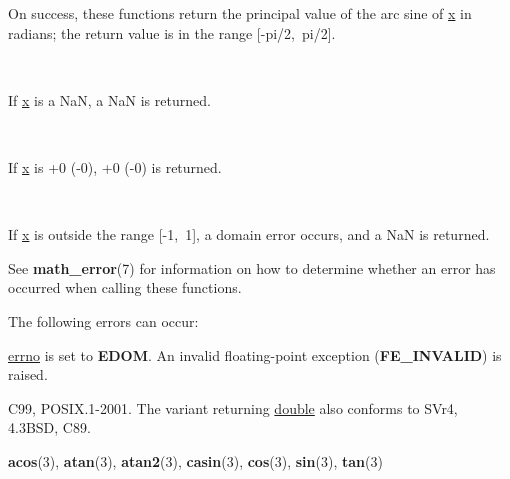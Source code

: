 \documentclass[]{article}
\let\realtextbf=\textbf
\renewcommand{\textbf}[1]{\textcolor{boldcolor}{\realtextbf{#1}}}
\renewcommand{\emph}[1]{\underline{#1}}
\begin{document}

On success, these functions return the principal value of the arc sine
of \emph{x} in radians; the return value is in the range
{[}-pi/2,~pi/2{]}.

~

If \emph{x} is a NaN, a NaN is returned.

~

If \emph{x} is +0 (-0), +0 (-0) is returned.

~

If \emph{x} is outside the range {[}-1,~1{]}, a domain error occurs, and
a NaN is returned.


See \textbf{math\_error}(7) for information on how to determine whether
an error has occurred when calling these functions.

The following errors can occur:

\begin{description}
\itemsep1pt\parskip0pt
\item[Domain error: \emph{x} is outside the range {[}-1,~1{]}]
\emph{errno} is set to \textbf{EDOM}. An invalid floating-point
exception (\textbf{FE\_INVALID}) is raised.
\end{description}


C99, POSIX.1-2001. The variant returning \emph{double} also conforms to
SVr4, 4.3BSD, C89.


\textbf{acos}(3), \textbf{atan}(3), \textbf{atan2}(3),
\textbf{casin}(3), \textbf{cos}(3), \textbf{sin}(3), \textbf{tan}(3)
\end{document}
